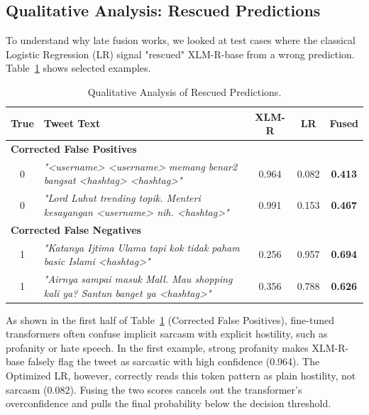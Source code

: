 \documentclass[conference]{IEEEtran}
\begin{document}
\subsection{Qualitative Analysis: Rescued Predictions}
To understand why late fusion works, we looked at test cases where the classical Logistic Regression (LR) signal "rescued" XLM-R-base from a wrong prediction. Table~\ref{tab:qualitative} shows selected examples.

\begin{table}[htbp]
\caption{Qualitative Analysis of Rescued Predictions.}
\begin{center}
\footnotesize
\renewcommand{\arraystretch}{1.3}
\begin{tabular}{c p{3.8cm} c c c}
\hline
\textbf{True} & \textbf{Tweet Text} & \textbf{XLM-R} & \textbf{LR} & \textbf{Fused} \\ \hline
\multicolumn{5}{l}{\textbf{Corrected False Positives}} \\
0 & \textit{"\textless{}username\textgreater{} \textless{}username\textgreater{} memang benar2 bangsat \textless{}hashtag\textgreater{} \textless{}hashtag\textgreater{}"} & 0.964 & 0.082 & \textbf{0.413} \\
0 & \textit{"Lord Luhut trending topik. Menteri kesayangan \textless{}username\textgreater{} nih. \textless{}hashtag\textgreater{}"} & 0.991 & 0.153 & \textbf{0.467} \\ \hline
\multicolumn{5}{l}{\textbf{Corrected False Negatives}} \\
1 & \textit{"Katanya Ijtima Ulama tapi kok tidak paham basic Islami \textless{}hashtag\textgreater{}"} & 0.256 & 0.957 & \textbf{0.694} \\
1 & \textit{"Airnya sampai masuk Mall. Mau shopping kali ya? Santun banget ya \textless{}hashtag\textgreater{}"} & 0.356 & 0.788 & \textbf{0.626} \\ \hline
\end{tabular}
\label{tab:qualitative}
\end{center}
\end{table}

As shown in the first half of Table~\ref{tab:qualitative} (Corrected False Positives), fine-tuned transformers often confuse implicit sarcasm with explicit hostility, such as profanity or hate speech. In the first example, strong profanity makes XLM-R-base falsely flag the tweet as sarcastic with high confidence (0.964). The Optimized LR, however, correctly reads this token pattern as plain hostility, not sarcasm (0.082). Fusing the two scores cancels out the transformer's overconfidence and pulls the final probability below the decision threshold.
\end{document}
